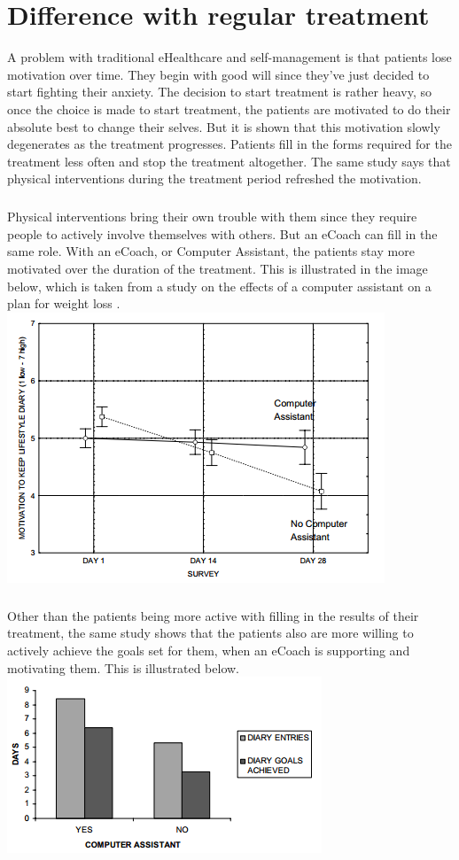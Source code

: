\documentclass[english,a4paper,pdftex]{report}
\begin{document}
\chapter{Difference with regular treatment}
A problem with traditional eHealthcare and self-management is that patients lose motivation over time. They begin with good will since they've just decided to start fighting their anxiety. The decision to start treatment is rather heavy, so once the choice is made to start treatment, the patients are motivated to do their absolute best to change their selves. But it is shown \cite{alpay2007} that this motivation slowly degenerates as the treatment progresses. Patients fill in the forms required for the treatment less often and stop the treatment altogether. The same study says that physical interventions during the treatment period refreshed the motivation.
\paragraph{}
Physical interventions bring their own trouble with them since they require people to actively involve themselves with others. But an eCoach can fill in the same role. With an eCoach, or Computer Assistant, the patients stay more motivated over the duration of the treatment. This is illustrated in the image below, which is taken from a study on the effects of a computer assistant on a plan for weight loss \cite{blanson2009online}.\\
\includegraphics[scale=0.8]{Graph1.png}
\paragraph{}
Other than the patients being more active with filling in the results of their treatment, the same study shows that the patients also are more willing to actively achieve the goals set for them, when an eCoach is supporting and motivating them. This is illustrated below.\\
\includegraphics[scale=1]{Graph2.png}
\end{document}
